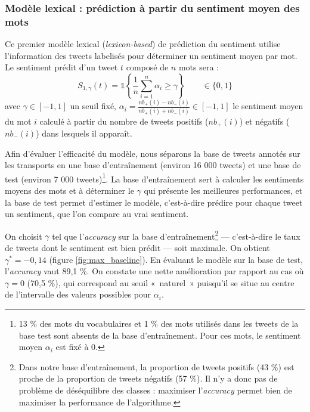 \documentclass[11pt,french,french]{article}
\let\rmarkdownfootnote\footnote%
\def\footnote{\protect\rmarkdownfootnote}
\begin{document}
\subsubsection{Modèle lexical : prédiction à partir du sentiment moyen
des mots}\label{sec:sentiments}

Ce premier modèle lexical (\emph{lexicon-based}) de prédiction du
sentiment utilise l'information des tweets labelisés pour déterminer un
sentiment moyen par mot. Le sentiment prédit d'un tweet \(t\) composé de
\(n\) mots sera :
\[S_{1,\gamma}(t) = \mathds{1}\left\{ \frac{1}{n} \sum \limits_{i=1}^n \alpha_i \geq \gamma\right\}  \qquad \in \{ 0,1 \}\]
avec \(\gamma \in [-1,1]\) un seuil fixé,
\(\alpha_i = \frac{nb_+(i) - nb_-(i)}{nb_+(i) + nb_-(i)} \in [-1,1]\) le
sentiment moyen du mot \(i\) calculé à partir du nombre de tweets
positifs (\(nb_+(i)\)) et négatifs (\(nb_-(i)\)) dans lesquels il
apparaît.

Afin d'évaluer l'efficacité du modèle, nous séparons la base de tweets
annotés sur les transports en une base d'entraînement (environ 16 000
tweets) et une base de test (environ 7 000 tweets)\footnote{13 \% des
  mots du vocabulaires et 1 \% des mots utilisés dans les tweets de la
  base test sont absents de la base d'entraînement. Pour ces mots, le
  sentiment moyen \(\alpha_i\) est fixé à 0.}. La base d'entraînement
sert à calculer les sentiments moyens des mots et à déterminer le
\(\gamma\) qui présente les meilleures performances, et la base de test
permet d'estimer le modèle, c'est-à-dire prédire pour chaque tweet un
sentiment, que l'on compare au vrai sentiment.

On choisit \(\gamma\) tel que l'\emph{accuracy} sur la base
d'entraînement\footnote{Dans notre base d'entraînement, la proportion de
  tweets positifs (43 \%) est proche de la proportion de tweets négatifs
  (57 \%). Il n'y a donc pas de problème de déséquilibre des classes :
  maximiser l'\emph{accuracy} permet bien de maximiser la performance de
  l'algorithme.} --- c'est-à-dire le taux de tweets dont le sentiment
est bien prédit --- soit maximale. On obtient \(\gamma^* = -0,14\)
(figure \ref{fig:max_baseline}). En évaluant le modèle sur la base de
test, l'\emph{accuracy} vaut 89,1 \%. On constate une nette amélioration
par rapport au cas où \(\gamma = 0\) (70,5 \%), qui correspond au seuil
«~naturel~» puisqu'il se situe au centre de l'intervalle des valeurs
possibles pour \(\alpha_i\).
\end{document}
